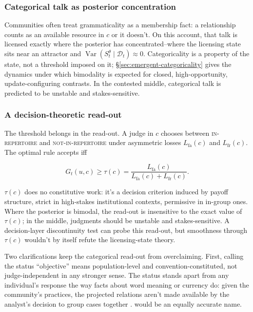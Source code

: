 \subsubsection{Categorical talk as posterior concentration}
\label{sec:categorical-talk}

Communities often treat grammaticality as a membership fact: a relationship
counts as an available resource in $c$ or it doesn't. On this account, that talk
is licensed exactly where the posterior has concentrated--where the licensing
state sits near an attractor and
$\operatorname{Var}(S_t^{\theta}\mid\mathcal{D}_t)\approx0$. Categoricality is a
property of the state, not a threshold imposed on it;
\S\ref{sec:emergent-categoricality} gives the dynamics under which bimodality
is expected for closed, high-opportunity, update-configuring contrasts. In the
contested middle, categorical talk is predicted to be unstable and
stakes-sensitive.

\subsubsection{A decision-theoretic read-out}
\label{sec:decision-readout}

The threshold belongs in the read-out. A judge in $c$ chooses between
\textsc{in-repertoire} and \textsc{not-in-repertoire} under asymmetric losses
$L_{\mathrm{fa}}(c)$ and $L_{\mathrm{fr}}(c)$. The optimal rule accepts iff

\begin{equation}
G_t(u,c)\geq \tau(c)
=\frac{L_{\mathrm{fa}}(c)}{L_{\mathrm{fa}}(c)+L_{\mathrm{fr}}(c)}.
\end{equation}

$\tau(c)$ does no constitutive work: it's a decision criterion induced by payoff
structure, strict in high-stakes institutional contexts, permissive in in-group
ones. Where the posterior is bimodal, the read-out is insensitive to the exact
value of $\tau(c)$; in the middle, judgments should be unstable and
stakes-sensitive. A decision-layer discontinuity test can probe this read-out,
but smoothness through $\tau(c)$ wouldn't by itself refute the licensing-state
theory.

Two clarifications keep the categorical read-out from overclaiming. First,
calling the status \enquote{objective} means population-level and
convention-constituted, not judge-independent in any stronger sense. The status
stands apart from any individual's response the way facts about word meaning or
currency do: given the community's practices, the projected relations aren't
made available by the analyst's decision to group cases together
\autocite{reynolds2026kindsProjectibilityProfiles}. 
would be an equally accurate name.


